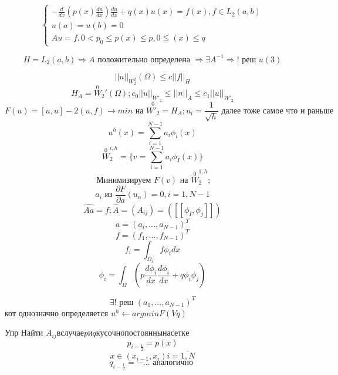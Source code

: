 \documentclass[12pt, a4paper]{article}
\begin{document}
\[
\left\{
\begin{array}{l}
    -\frac{d}{dx}(p(x) \frac{du}{dx})\frac{du}{dx} + q(x)u(x) = f(x), f \in L_2(a, b) \\
    u(a) = u(b) = 0 \\
    Au = f,  0< p_0 \leq p(x) \leq p, 0 \leqq(x) \leq q
\end{array}
\right.
\]

\[ H = L_2 (a, b) \Rightarrow A \textrm{ положительно определена } \Rightarrow \exists A^{-1} \Rightarrow ! \textrm{ реш } u(3) \]

\[ \ \]
\[ {||u||}_{W_2^2} (\Omega) \leq c {||f||}_H \]
\[ H_A = \overset{0}{W}_2'(\Omega); c_0 {||u||}_{W'_2} \leq {||n||}_A \leq c_1 {||u||}_{{W'}_2} \]
\[ F(u) = [u, u] -2 (u, f) \rightarrow min \textrm{ на } \overset{0}{{W'}_2} = H_A; u_i = \frac{1}{\sqrt{h}} \textrm{ далее тоже самое что и раньше } \]
\[ u^h(x) = \sum_{i=1}^{N-1} a_i \phi_i (x) \]
\[ \overset{0}{W}_2^{i, h} = \{ v = \sum_{i=1}^{N-1} a_i \phi_I (x) \} \]
\[ \textrm{ Минимизируем }F(v) \textrm{ на } \overset{0}{W}_2^{1, h}; \]
\[ a_i \textrm{ из }\frac{\partial F}{\partial a}(u_n) = 0, i=1, N-1 \]
\[ \hat{A a} = f; \hat{A} = (A_{ij}) = ([[\phi_I, \phi_j]]) \]
\[ a = (a_{i}, ... , a_{N-1})^T \]
\[ {f = (f_1, ... , f_{N-1})}^T \]
\[ f_i = \int_{\Omega_i}^{} f \phi_i dx \]
\[ \phi_i = \int_{\Omega}^{} (p \frac{d\phi_i}{dx}\frac{d \phi_i}{dx} + q \phi_i \phi_j) \]

\[ \exists ! \textrm{ реш } {(a_1, ..., a_{N-1})}^T \]
кот однозначно определяется $ u^h \leftarrow argmin F(Vq) $

Упр Найти $ A_{ij} в случае p и q кусочнопостоянны на сетке$
\[ p_{i-\frac{1}{2}} = p(x)\]
\[x\in (x_{i-1}, x_i) i = \overline{1, N} \]
\[ q_{i-\frac{1}{2}} = - ... \textrm{ аналогично } \]
\end{document}
